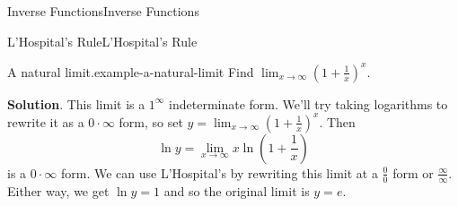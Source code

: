 \documentclass[10pt,]{book}
\numberwithin{equation}{section}
\begin{document}
\begin{chapterptx}{Inverse Functions}{}{Inverse Functions}{}{}
\begin{sectionptx}{L'Hospital's Rule}{}{L'Hospital's Rule}{}{}
\begin{example}{A natural limit.}{example-a-natural-limit}
\hypertarget{p-306}{}%
Find \(\lim_{x\to\infty}\left(1+\frac{1}{x}\right)^{x}\).%
\par\smallskip%
\noindent\textbf{Solution}.\hypertarget{solution-69}{}\quad%
\hypertarget{p-307}{}%
This limit is a \(1^{\infty}\) indeterminate form. We'll try taking logarithms to rewrite it as a \(0\cdot\infty\) form, so set \(y = \lim_{x\to\infty}\left(1+\frac{1}{x}\right)^{x}\). Then%
\begin{equation*}
\ln y = \lim_{x\to\infty}x\ln\left(1+\frac{1}{x}\right)
\end{equation*}
is a \(0\cdot\infty\) form. We can use L'Hospital's by rewriting this limit at a \(\frac{0}{0}\) form or \(\frac{\infty}{\infty}\). Either way, we get \(\ln y = 1\) and so the original limit is \(y = e\).%
\end{example}
\end{sectionptx}
\end{chapterptx}
%
%
\typeout{************************************************}
\typeout{************************************************}
%
\end{document}
